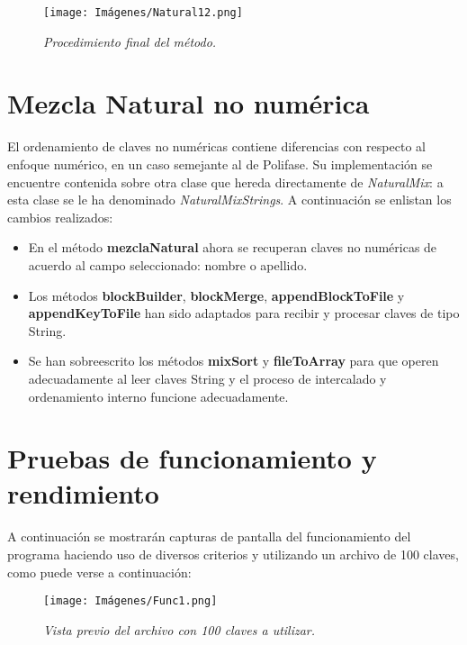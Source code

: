 \documentclass[letterpaper,12pt]{extarticle}
\begin{document}
\begin{itemize}
\end{itemize}

\begin{figure}[h!]
    \centering
    \texttt{[image: Imágenes/Natural12.png]}
    \caption{\textit{Procedimiento final del método.}}
    \label{fig:Natural12}
    \end{figure} 
    
\section{Mezcla Natural no numérica}

\noindent El ordenamiento de claves no numéricas contiene diferencias con respecto al enfoque numérico, en un caso semejante al de Polifase. Su implementación se encuentre contenida sobre otra clase que hereda directamente de \textit{NaturalMix}: a esta clase se le ha denominado \textit{NaturalMixStrings}. A continuación se enlistan los cambios realizados:

\begin{itemize}
\item En el método \textbf{mezclaNatural} ahora se recuperan claves no numéricas de acuerdo al campo seleccionado: nombre o apellido.
\item Los métodos \textbf{blockBuilder}, \textbf{blockMerge}, \textbf{appendBlockToFile} y \textbf{appendKeyToFile} han sido adaptados para recibir y procesar claves de tipo String.
\item Se han sobreescrito los métodos \textbf{mixSort} y \textbf{fileToArray} para que operen adecuadamente al leer claves String y el proceso de intercalado y ordenamiento interno funcione adecuadamente.
\end{itemize}



\section{Pruebas de funcionamiento y rendimiento}

\noindent A continuación se mostrarán capturas de pantalla del funcionamiento del programa haciendo uso de diversos criterios y utilizando un archivo de 100 claves, como puede verse a continuación:

\begin{figure}[h!]
    \centering
    \texttt{[image: Imágenes/Func1.png]}
    \caption{\textit{Vista previo del archivo con 100 claves a utilizar.}}
    \label{fig:Func1}
    \end{figure} 
\end{document}
